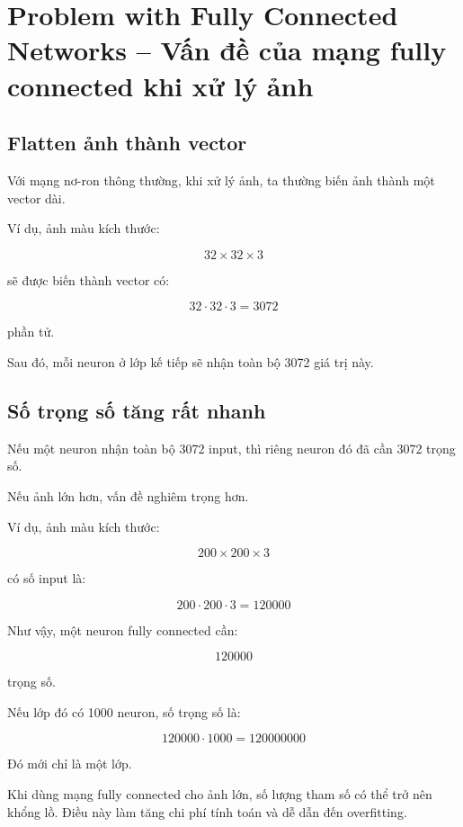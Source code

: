 \section{Problem with Fully Connected Networks -- Vấn đề của mạng fully connected khi xử lý ảnh}

\subsection{Flatten ảnh thành vector}

Với mạng nơ-ron thông thường, khi xử lý ảnh, ta thường biến ảnh thành một vector dài.

Ví dụ, ảnh màu kích thước:

\[
    32 \times 32 \times 3
\]

sẽ được biến thành vector có:

\[
    32 \cdot 32 \cdot 3 = 3072
\]

phần tử.

Sau đó, mỗi neuron ở lớp kế tiếp sẽ nhận toàn bộ 3072 giá trị này.

\subsection{Số trọng số tăng rất nhanh}

Nếu một neuron nhận toàn bộ 3072 input, thì riêng neuron đó đã cần 3072 trọng số.

Nếu ảnh lớn hơn, vấn đề nghiêm trọng hơn.

Ví dụ, ảnh màu kích thước:

\[
    200 \times 200 \times 3
\]

có số input là:

\[
    200 \cdot 200 \cdot 3 = 120000
\]

Như vậy, một neuron fully connected cần:

\[
    120000
\]

trọng số.

Nếu lớp đó có 1000 neuron, số trọng số là:

\[
    120000 \cdot 1000 = 120000000
\]

Đó mới chỉ là một lớp.

\begin{canhbao}
Khi dùng mạng fully connected cho ảnh lớn, số lượng tham số có thể trở nên khổng lồ. Điều này làm tăng chi phí tính toán và dễ dẫn đến overfitting.
\end{canhbao}

